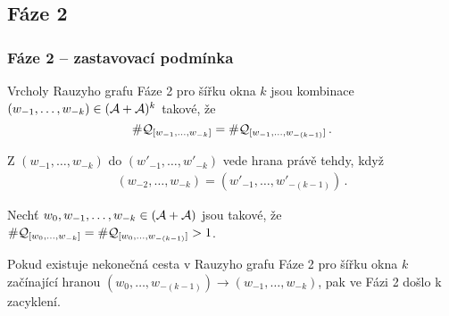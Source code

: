 \documentclass[11pt]{beamer}
\begin{document}
\subsection{Fáze 2}
\begin{frame}
\frametitle{Fáze 2 -- zastavovací podmínka}
Vrcholy Rauzyho grafu Fáze 2 pro šířku okna $k$ jsou kombinace $(w_{-1}, \dots ,w_{-k})\in(\mathcal{A}+\mathcal{A})^k$ takové, že 
$$\#\mathcal{Q}_{[w_{-1},\dots, w_{-k}]}=\#\mathcal{Q}_{[w_{-1},\dots, w_{-(k-1)}]}\,.$$

\vspace{1cm}
Z $(w_{-1}, \dots ,w_{-k})$ do $(w'_{-1}, \dots ,w'_{-k})$ vede hrana právě tehdy, když
\begin{align*}
 (w_{-2}, \dots,w_{-k})=(w'_{-1}, \dots, w'_{-(k-1)})\,.
\end{align*}
\end{frame}


\begin{frame}
Nechť $w_0,w_{-1},\dots, w_{-k}\in(\mathcal{A}+\mathcal{A})$ jsou takové, že $\#\mathcal{Q}_{[w_{0},\dots, w_{-k}]}=\#\mathcal{Q}_{[w_{0},\dots, w_{-(k-1)}]}>1$. 

\vspace{1cm}
Pokud existuje nekonečná cesta v Rauzyho grafu Fáze 2 pro šířku okna $k$ začínající hranou $(w_{0}, \dots ,w_{-(k-1)})\rightarrow (w_{-1}, \dots ,w_{-k})$, pak ve Fázi 2 došlo k zacyklení.
\end{frame}
\end{document}
